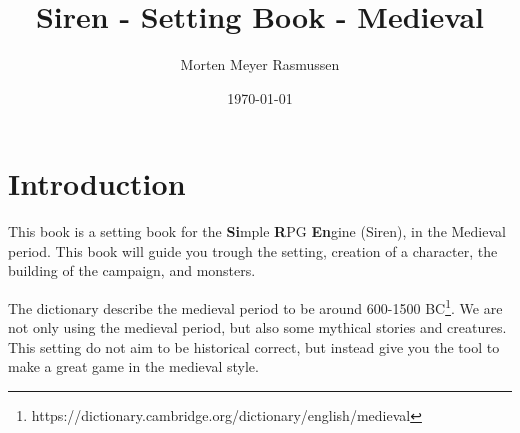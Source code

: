 \documentclass[12pt, a4paper]{book}
\title{Siren - Setting Book - Medieval}
\author{Morten Meyer Rasmussen}
\date{\today}
\begin{document}
\maketitle

\section*{Introduction}
This book is a setting book for the \textbf{Si}mple \textbf{R}PG \textbf{En}gine (Siren), in the Medieval period.
This book will guide you trough the setting, creation of a character, the building of the campaign, and monsters.

The dictionary describe the medieval period to be around 600-1500 BC\footnote{https://dictionary.cambridge.org/dictionary/english/medieval}.
We are not only using the medieval period, but also some mythical stories and creatures.
This setting do not aim to be historical correct, but instead give you the tool to make a great game in the medieval style.

\tableofcontents









\end{document}
